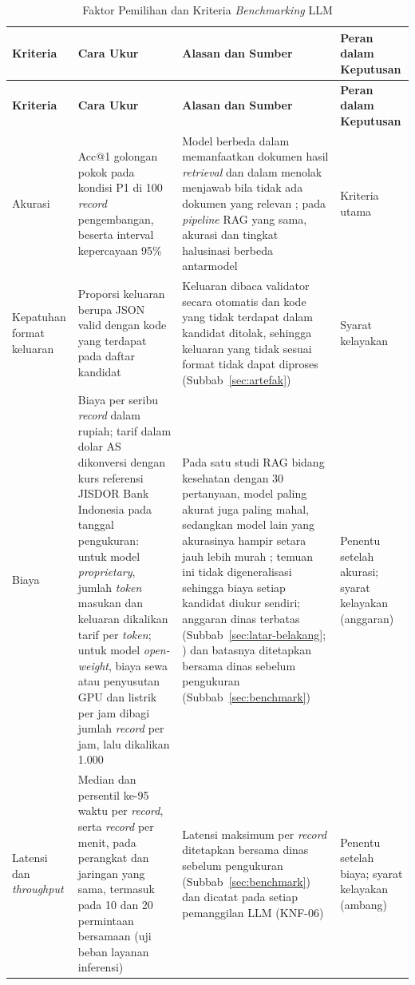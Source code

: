 {\footnotesize
\setlength{\tabcolsep}{4pt}
\renewcommand{\arraystretch}{1.15}
\begin{longtable}{|L{0.13\textwidth}|L{0.31\textwidth}|L{0.30\textwidth}|L{0.15\textwidth}|}
\caption{Faktor Pemilihan dan Kriteria \textit{Benchmarking} LLM}
\label{tab:benchmark}\\
\hline
\textbf{Kriteria} & \textbf{Cara Ukur} & \textbf{Alasan dan Sumber} & \textbf{Peran dalam Keputusan} \\ \hline
\endfirsthead
\hline
\textbf{Kriteria} & \textbf{Cara Ukur} & \textbf{Alasan dan Sumber} & \textbf{Peran dalam Keputusan} \\ \hline
\endhead
Akurasi & Acc@1 golongan pokok pada kondisi P1 di 100 \textit{record} pengembangan, beserta interval kepercayaan 95\% & Model berbeda dalam memanfaatkan dokumen hasil \textit{retrieval} dan dalam menolak menjawab bila tidak ada dokumen yang relevan \cite{chen2024rgb}; pada \textit{pipeline} RAG yang sama, akurasi dan tingkat halusinasi berbeda antarmodel \cite{ke2025rag10llm} & Kriteria utama \\ \hline
Kepatuhan format keluaran & Proporsi keluaran berupa JSON valid dengan kode yang terdapat pada daftar kandidat & Keluaran dibaca validator secara otomatis dan kode yang tidak terdapat dalam kandidat ditolak, sehingga keluaran yang tidak sesuai format tidak dapat diproses (Subbab~\ref{sec:artefak}) & Syarat kelayakan \\ \hline
Biaya & Biaya per seribu \textit{record} dalam rupiah; tarif dalam dolar AS dikonversi dengan kurs referensi JISDOR Bank Indonesia pada tanggal pengukuran: untuk model \textit{proprietary}, jumlah \textit{token} masukan dan keluaran dikalikan tarif per \textit{token}; untuk model \textit{open-weight}, biaya sewa atau penyusutan GPU dan listrik per jam dibagi jumlah \textit{record} per jam, lalu dikalikan 1.000 & Pada satu studi RAG bidang kesehatan dengan 30 pertanyaan, model paling akurat juga paling mahal, sedangkan model lain yang akurasinya hampir setara jauh lebih murah \cite{escudero2026ragamr}; temuan ini tidak digeneralisasi sehingga biaya setiap kandidat diukur sendiri; anggaran dinas terbatas (Subbab~\ref{sec:latar-belakang}; \cite[hlm.~107]{lkjip2025toba}) dan batasnya ditetapkan bersama dinas sebelum pengukuran (Subbab~\ref{sec:benchmark}) & Penentu setelah akurasi; syarat kelayakan (anggaran) \\ \hline
Latensi dan \textit{throughput} & Median dan persentil ke-95 waktu per \textit{record}, serta \textit{record} per menit, pada perangkat dan jaringan yang sama, termasuk pada 10 dan 20 permintaan bersamaan (uji beban layanan inferensi) & Latensi maksimum per \textit{record} ditetapkan bersama dinas sebelum pengukuran (Subbab~\ref{sec:benchmark}) dan dicatat pada setiap pemanggilan LLM (KNF-06) & Penentu setelah biaya; syarat kelayakan (ambang) \\ \hline

\end{longtable}}
